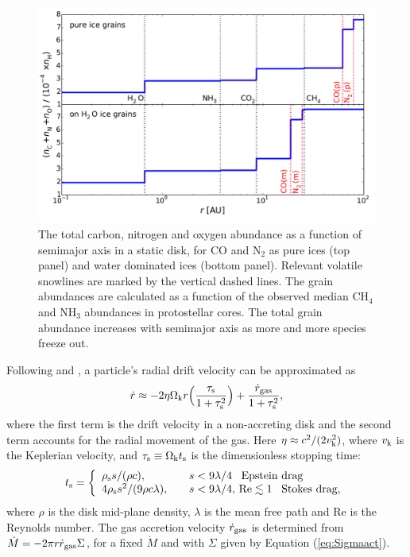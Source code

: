 \documentclass[apj]{emulateapj}
\begin{document}
\begin{figure}[t!]
\centering
\includegraphics[width=\textwidth]{CNO_and_snowlines_2.pdf}
\caption{The total carbon, nitrogen and oxygen abundance as a function of semimajor axis in a static disk, for CO and N$_2$ as pure ices (top panel) and water dominated ices (bottom panel). Relevant volatile snowlines are marked by the vertical dashed lines. The grain abundances are calculated as a function of the observed median CH$_4$ and NH$_3$ abundances in protostellar cores. The total grain abundance increases with semimajor axis as more and more species freeze out.} 
\label{fig:CNOstatic}
\end{figure}

Following \citet{chiang10} and \citet{birnstiel12}, a particle's radial drift velocity can be approximated as 
\begin{equation}
\label{eq:rdotact}
\dot{r} \approx -2 \eta \Omega_{\rm k} r \Big(\frac{\tau_{\rm s}}{1+\tau_{\rm s}^2}\Big) + \frac{\dot{r}_{\rm gas}}{1+\tau_{\rm s}^2},
\end{equation}
where the first term is the drift velocity in a non-accreting disk and the second term accounts for the radial movement of the gas. Here $\eta \approx c^2/(2 v_{\rm k}^2)$, where $v_{\rm k}$ is the Keplerian velocity, and $\tau_{\rm s} \equiv \Omega_{\rm k} t_{\rm s}$ is the dimensionless stopping time:
\begin{equation}
\label{eq:ts}
t_{\rm s}= \left\{
\begin{array}{l l}
\rho_{\rm s} s / (\rho c), & \quad s < 9 \lambda/4 \,\,\,\ \text{Epstein drag} \\
4 \rho_{\rm s} s^2 / (9 \rho c \lambda), & \quad s < 9 \lambda/4, \,\text{Re} \lesssim 1 \,\,\,\ \text{Stokes drag,}
\end{array} 
\right.
\end{equation}
where $\rho$ is the disk mid-plane density, $\lambda$ is the mean free path and Re is the Reynolds number.  The gas accretion velocity $\dot{r}_{\rm gas}$ is determined from $\dot{M}=-2 \pi r \dot{r}_{\rm gas} \Sigma$, for a fixed $\dot{M}$ and with $\Sigma$ given by Equation (\ref{eq:Sigmaact}). 
\end{document}
